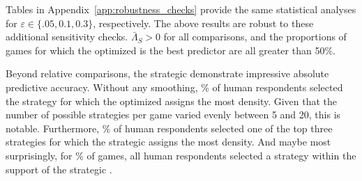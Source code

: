 Tables in Appendix~\ref{app:robustness_checks} provide the same statistical analyses for $\varepsilon \in \{.05, 0.1, 0.3\}$, respectively.
The above results are robust to these additional sensitivity checks.
$\bar \Lambda_S > 0 $ for all comparisons, and the proportions of games for which the optimized \aisub{} is the best predictor are all greater than 50\%.

Beyond relative comparisons, the strategic  demonstrate impressive absolute predictive accuracy.
Without any smoothing, \OptHighestMatchRate\% of human respondents selected the strategy for which the optimized \aisub{} assigns the most density.
Given that the number of possible strategies per game varied evenly between 5 and 20, this is notable.
Furthermore, \OptTopThreeMatchRate\% of human respondents selected one of the top three strategies for which the strategic \aisub{} assigns the most density.
And maybe most surprisingly, for \OptGameAllMatchRate\% of games, all human respondents selected a strategy within the support of the strategic \aisub{}.
